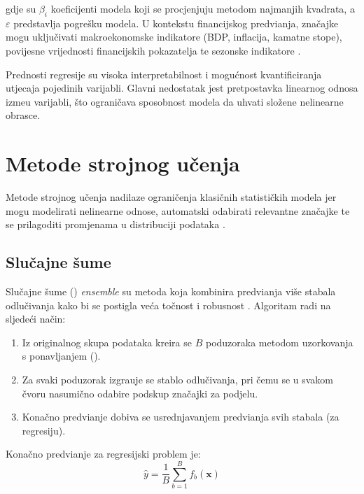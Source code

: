 \documentclass[zavrsnirad]{fer}
\begin{document}
gdje su $\beta_i$ koeficijenti modela koji se procjenjuju metodom najmanjih kvadrata, a $\varepsilon$ predstavlja pogre\v{s}ku modela. U kontekstu financijskog predvi\dj anja, zna\v{c}ajke mogu uklju\v{c}ivati makroekonomske indikatore (BDP, inflacija, kamatne stope), povijesne vrijednosti financijskih pokazatelja te sezonske indikatore \citep{masini2023machine}.

Prednosti regresije su visoka interpretabilnost i mogu\'{c}nost kvantificiranja utjecaja pojedinih varijabli. Glavni nedostatak jest pretpostavka linearnog odnosa izme\dj u varijabli, \v{s}to ograni\v{c}ava sposobnost modela da uhvati slo\v{z}ene nelinearne obrasce.

\section{Metode strojnog u\v{c}enja}
\label{sec:ml_metode}

Metode strojnog u\v{c}enja nadilaze ograni\v{c}enja klasi\v{c}nih statisti\v{c}kih modela jer mogu modelirati nelinearne odnose, automatski odabirati relevantne zna\v{c}ajke te se prilagoditi promjenama u distribuciji podataka \citep{hastie2009elements}.

\subsection{Slu\v{c}ajne \v{s}ume}
\label{subsec:random_forest}

Slu\v{c}ajne \v{s}ume () \textit{ensemble} su metoda koja kombinira predvi\dj anja vi\v{s}e stabala odlu\v{c}ivanja kako bi se postigla ve\'{c}a to\v{c}nost i robusnost \citep{breiman2001random}. Algoritam radi na sljede\'{c}i na\v{c}in:

\begin{enumerate}
    \item Iz originalnog skupa podataka kreira se $B$ poduzoraka metodom uzorkovanja s ponavljanjem ().
    \item Za svaki poduzorak izgra\dj uje se stablo odlu\v{c}ivanja, pri \v{c}emu se u svakom \v{c}voru nasumi\v{c}no odabire podskup zna\v{c}ajki za podjelu.
    \item Kona\v{c}no predvi\dj anje dobiva se usrednjavanjem predvi\dj anja svih stabala (za regresiju).
\end{enumerate}

Kona\v{c}no predvi\dj anje za regresijski problem je:
\begin{equation}
    \hat{y} = \frac{1}{B} \sum_{b=1}^{B} f_b(\mathbf{x})
    \label{eq:random_forest}
\end{equation}
\end{document}
